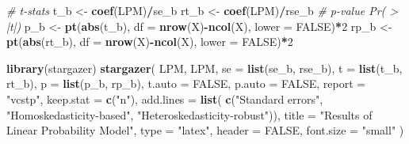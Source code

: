 \documentclass[
  12pt,
]{article}
\newenvironment{Shaded}{\begin{snugshade}}{\end{snugshade}}
\newcommand{\CommentTok}[1]{\textcolor[rgb]{0.56,0.35,0.01}{\textit{#1}}}
\newcommand{\DataTypeTok}[1]{\textcolor[rgb]{0.13,0.29,0.53}{#1}}
\newcommand{\DecValTok}[1]{\textcolor[rgb]{0.00,0.00,0.81}{#1}}
\newcommand{\KeywordTok}[1]{\textcolor[rgb]{0.13,0.29,0.53}{\textbf{#1}}}
\newcommand{\NormalTok}[1]{#1}
\newcommand{\OperatorTok}[1]{\textcolor[rgb]{0.81,0.36,0.00}{\textbf{#1}}}
\newcommand{\OtherTok}[1]{\textcolor[rgb]{0.56,0.35,0.01}{#1}}
\newcommand{\StringTok}[1]{\textcolor[rgb]{0.31,0.60,0.02}{#1}}
\begin{document}
\begin{Shaded}
\begin{Highlighting}[]
\CommentTok{\# t{-}stats}
\NormalTok{t\_b \textless{}{-}}\StringTok{ }\KeywordTok{coef}\NormalTok{(LPM)}\OperatorTok{/}\NormalTok{se\_b }
\NormalTok{rt\_b \textless{}{-}}\StringTok{ }\KeywordTok{coef}\NormalTok{(LPM)}\OperatorTok{/}\NormalTok{rse\_b}
\CommentTok{\# p{-}value Pr( \textgreater{} |t|)}
\NormalTok{p\_b \textless{}{-}}\StringTok{ }\KeywordTok{pt}\NormalTok{(}\KeywordTok{abs}\NormalTok{(t\_b), }\DataTypeTok{df =} \KeywordTok{nrow}\NormalTok{(X)}\OperatorTok{{-}}\KeywordTok{ncol}\NormalTok{(X), }\DataTypeTok{lower =} \OtherTok{FALSE}\NormalTok{)}\OperatorTok{*}\DecValTok{2}
\NormalTok{rp\_b \textless{}{-}}\StringTok{ }\KeywordTok{pt}\NormalTok{(}\KeywordTok{abs}\NormalTok{(rt\_b), }\DataTypeTok{df =} \KeywordTok{nrow}\NormalTok{(X)}\OperatorTok{{-}}\KeywordTok{ncol}\NormalTok{(X), }\DataTypeTok{lower =} \OtherTok{FALSE}\NormalTok{)}\OperatorTok{*}\DecValTok{2}

\KeywordTok{library}\NormalTok{(stargazer)}
\KeywordTok{stargazer}\NormalTok{(}
\NormalTok{  LPM, LPM,}
  \DataTypeTok{se =} \KeywordTok{list}\NormalTok{(se\_b, rse\_b), }\DataTypeTok{t =} \KeywordTok{list}\NormalTok{(t\_b, rt\_b), }\DataTypeTok{p =} \KeywordTok{list}\NormalTok{(p\_b, rp\_b),}
  \DataTypeTok{t.auto =} \OtherTok{FALSE}\NormalTok{, }\DataTypeTok{p.auto =} \OtherTok{FALSE}\NormalTok{,}
  \DataTypeTok{report =} \StringTok{"vcstp"}\NormalTok{, }\DataTypeTok{keep.stat =} \KeywordTok{c}\NormalTok{(}\StringTok{"n"}\NormalTok{),}
  \DataTypeTok{add.lines =} \KeywordTok{list}\NormalTok{(}
    \KeywordTok{c}\NormalTok{(}\StringTok{"Standard errors"}\NormalTok{, }\StringTok{"Homoskedasticity{-}based"}\NormalTok{, }\StringTok{"Heteroskedasticity{-}robust"}\NormalTok{)),}
  \DataTypeTok{title =} \StringTok{"Results of Linear Probability Model"}\NormalTok{,}
  \DataTypeTok{type =} \StringTok{"latex"}\NormalTok{, }\DataTypeTok{header =} \OtherTok{FALSE}\NormalTok{, }\DataTypeTok{font.size =} \StringTok{"small"}
\NormalTok{)}
\end{Highlighting}
\end{Shaded}
\end{document}
